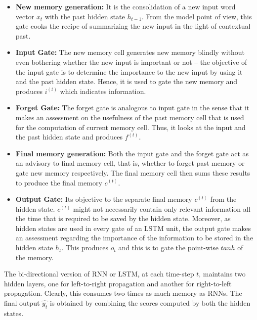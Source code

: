 \begin{itemize}
	\item \textbf{New memory generation: }It is the consolidation of a new input word vector $x_t$ with the past hidden state $h_{t-1}$. From the model point of view, this gate cooks the recipe of summarizing the new input in the light of contextual past.

	\item \textbf{Input Gate: }The new memory cell generates new memory blindly without even bothering whether the new input is important or not -- the objective of the input gate is to determine the importance to the new input by using it and the past hidden state. Hence, it is used to gate the new memory and produces $i^{(t)}$ which indicates information.

	\item \textbf{Forget Gate: }The forget gate is analogous to input gate in the sense that it makes an assessment on the usefulness of the past memory cell that is used for the computation of current memory cell. Thus, it looks at the input and the past hidden state and produces $f^{(t)}$.

	\item \textbf{Final memory generation: }Both the input gate and the forget gate act as an advisory to final memory cell, that is, whether to forget past memory or gate new memory respectively. The final memory cell then sums these results to produce the final memory $c^{(t)}$.

	\item \textbf{Output Gate: } Its objective to the separate final memory $c^{(t)}$ from the hidden state. $c^{(t)}$ might not necessarily contain only relevant information all the time that is required to be saved by the hidden state. Moreover, as hidden states are used in every gate of an LSTM unit, the output gate makes an assessment regarding the importance of the information to be stored in the hidden state $h_t$. This produces $o_t$ and this is to gate the point-wise $tanh$ of the memory.
\end{itemize}

The bi-directional version of RNN or LSTM, at each time-step $t$, maintains two hidden layers, one for left-to-right propagation and another for right-to-left propagation. Clearly, this consumes two times as much memory as RNNs. The final output $\widehat{y_t}$ is obtained by combining the scores computed by both the hidden states.


